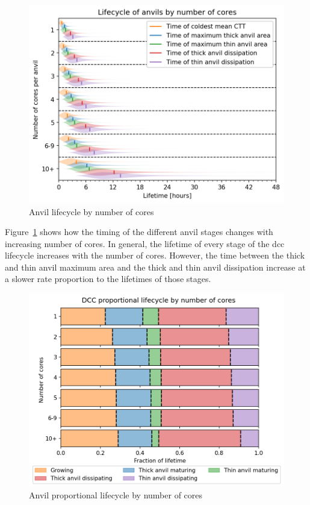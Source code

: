 \begin{figure}[tp]
    \centering
    \includegraphics[width=\textwidth]{figures/ch2_25.png}
    \caption{Anvil lifecycle by number of cores}
    \label{fig:anvil_number_of_cores_lifecycle}
\end{figure}

Figure~\ref{fig:anvil_number_of_cores_lifecycle} shows how the timing of the different anvil stages changes with increasing number of cores.
In general, the lifetime of every stage of the \acrshort{dcc} lifecycle increases with the number of cores.
However, the time between the thick and thin anvil maximum area and the thick and thin anvil dissipation increase at a slower rate proportion to the lifetimes of those stages.

\begin{figure}[tp]
    \centering
    \includegraphics[width=\textwidth]{figures/ch2_26.png}
    \caption{Anvil proportional lifecycle by number of cores}
    \label{fig:anvil_number_of_cores_proportional_lifecycle}
\end{figure}

